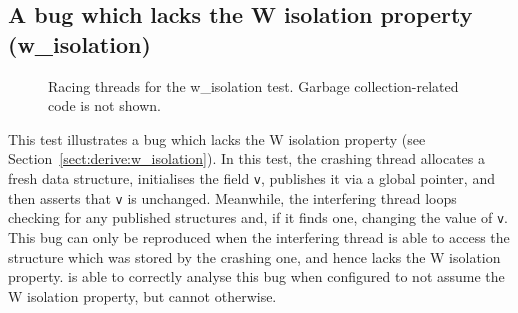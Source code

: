 
\subsection{A bug which lacks the W isolation property (w\_isolation)}

\begin{figure}
  \caption{Racing threads for the w\_isolation test.  Garbage
    collection-related code is not shown.}
  \label{fig:w_isolation}
\end{figure}

This test illustrates a bug which lacks the W isolation property (see
Section~\ref{sect:derive:w_isolation}).  In this test, the crashing
thread allocates a fresh data structure, initialises the field
\texttt{v}, publishes it via a global pointer, and then asserts that
\texttt{v} is unchanged.  Meanwhile, the interfering thread loops
checking for any published structures and, if it finds one, changing
the value of \texttt{v}.  This bug can only be reproduced when the
interfering thread is able to access the structure which was stored by
the crashing one, and hence lacks the W isolation property.
{\Implementation} is able to correctly analyse this bug when
configured to not assume the W isolation property, but cannot
otherwise.

